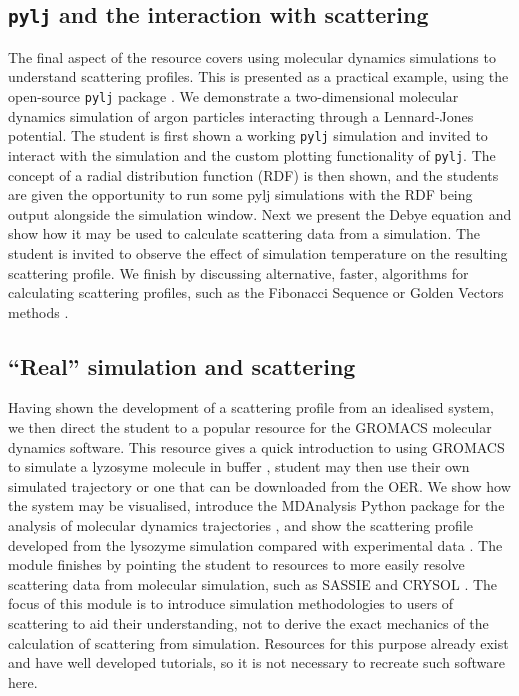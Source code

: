 \documentclass[amsmath,amssymb,twocolumn,superscriptaddress]{revtex4-1}
\begin{document}
\subsection{\texttt{pylj} and the interaction with scattering}

The final aspect of the resource covers using molecular dynamics simulations to understand scattering profiles.
This is presented as a practical example, using the open-source \texttt{pylj} package \cite{mccluskey_pylj_2018,mccluskey_arm61/pylj_2019-2}.
We demonstrate a two-dimensional molecular dynamics simulation of argon particles interacting through a Lennard-Jones potential.
The student is first shown a working \texttt{pylj} simulation and invited to interact with the simulation and the custom plotting functionality of \texttt{pylj}.
The concept of a radial distribution function (RDF) is then shown, and the students are given the opportunity to run some pylj simulations with the RDF being output alongside the simulation window.
Next we present the Debye equation \cite{debye_zerstreuung_1915} and show how it may be used to calculate scattering data from a simulation.
The student is invited to observe the effect of simulation temperature on the resulting scattering profile.
We finish by discussing alternative, faster, algorithms for calculating scattering profiles, such as the Fibonacci Sequence or Golden Vectors methods \cite{svergun_solution_1994,watson_rapid_2013}.

\subsection{``Real'' simulation and scattering}

Having shown the development of a scattering profile from an idealised system, we then direct the student to a popular resource for the GROMACS \cite{berendsen_gromacs_1995} molecular dynamics software.
This resource gives a quick introduction to using GROMACS to simulate a lyzosyme molecule in buffer \cite{lemkul_gromacs_2019}, student may then use their own simulated trajectory or one that can be downloaded from the OER.
We show how the system may be visualised, introduce the MDAnalysis Python package for the analysis of molecular dynamics trajectories \cite{michaud-agrawal_mdanalysis_2011,gowers_mdanalysis_2016}, and show the scattering profile developed from the lysozyme simulation compared with experimental data \cite{franke_correlation_2015}.
The module finishes by pointing the student to resources to more easily resolve scattering data from molecular simulation, such as SASSIE and CRYSOL \cite{perkins_atomistic_2016,svergun_crysol_1995}.
The focus of this module is to introduce simulation methodologies to users of scattering to aid their understanding, not to derive the exact mechanics of the calculation of scattering from simulation.
Resources for this purpose already exist and have well developed tutorials, so it is not necessary to recreate such software here.
\end{document}
